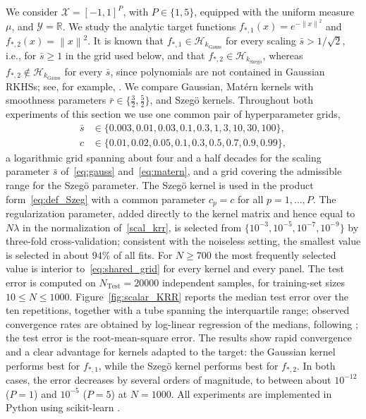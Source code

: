 \documentclass[11pt]{article}
\numberwithin{equation}{section}
\theoremstyle{plain}
\theoremstyle{definition}
\theoremstyle{remark}
\newcommand{\Hs}{\mathcal{H}}
\newcommand{\norm}[1]{\left\lVert#1\right\rVert}
\begin{document}
We consider $\mathcal{X}=[-1,1]^P$, with $P\in\{1,5\}$, equipped with the uniform measure $\mu$, and $\mathcal{Y}=\mathbb{R}$. We study the analytic target functions $f_{*,1}(x)=e^{-\norm{x}^2}$ and $f_{*,2}(x)=\norm{x}^2$. It is known that $f_{*,1}\in\Hs_{k_{\mathrm{Gauss}}}$ for every scaling $\bar s>1/\sqrt{2}$, i.e., for $\bar s\geq1$ in the grid used below, and that $f_{*,2}\in\Hs_{k_{\mathrm{Szeg\ddot{o}}}}$, whereas $f_{*,2}\notin\Hs_{k_{\mathrm{Gauss}}}$ for every $\bar s$, since polynomials are not contained in Gaussian RKHSs; see, for example, \cite[Theorem 2]{minh2010some}. We compare Gaussian, Matérn kernels with smoothness parameters $\bar r\in\{\frac32,\frac52\}$, and Szegö kernels. Throughout both experiments of this section we use one common pair of hyperparameter grids,
\begin{equation}
\begin{aligned}
\bar s&\in\{0.003,0.01,0.03,0.1,0.3,1,3,10,30,100\},\\
c&\in\{0.01,0.02,0.05,0.1,0.3,0.5,0.7,0.9,0.99\},
\end{aligned}
\label{eq:shared_grid}
\end{equation}
a logarithmic grid spanning about four and a half decades for the scaling parameter $\bar s$ of~\eqref{eq:gauss} and~\eqref{eq:matern}, and a grid covering the admissible range for the Szegö parameter. The Szegö kernel is used in the product form~\eqref{eq:def_Szeg} with a common parameter $c_p=c$ for all $p=1,\ldots,P$. The regularization parameter, added directly to the kernel matrix  and hence equal to $N\lambda$ in the normalization of~\eqref{scal_krr}, is selected from $\{10^{-3},10^{-5},10^{-7},10^{-9}\}$ by three-fold cross-validation; consistent with the noiseless setting, the smallest value is selected in about $94\%$ of all fits. For $N\geq700$ the most frequently selected value is interior to~\eqref{eq:shared_grid} for every kernel and every panel. The test error is computed on $N_{\mathrm{Test}}=20000$ independent samples, for training-set sizes $10\leq N\leq1000$. Figure~\ref{fig:scalar_KRR} reports the median test error over the ten repetitions, together with a tube spanning the interquartile range; observed convergence rates are obtained by log-linear regression of the medians, following \cite{zhang2024optimality}; the test error is the root-mean-square error.
The results show rapid convergence and a clear advantage for kernels adapted to the target: the Gaussian kernel performs best for $f_{*,1}$, while the Szegö kernel performs best for $f_{*,2}$. In both cases, the error decreases by several orders of magnitude, to between about $10^{-12}$ ($P=1$) and $10^{-5}$ ($P=5$) at $N=1000$. All experiments are implemented in Python using scikit-learn \cite{scikit-learn}.
\end{document}
